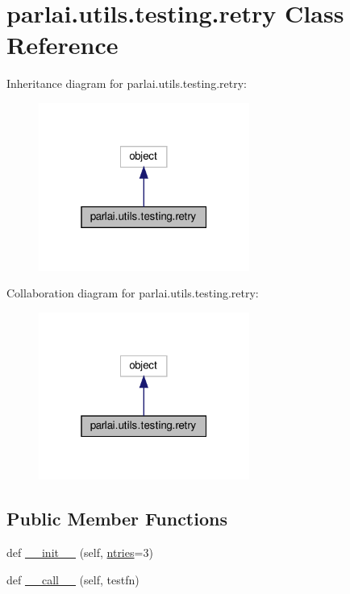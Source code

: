 \hypertarget{classparlai_1_1utils_1_1testing_1_1retry}{}\section{parlai.\+utils.\+testing.\+retry Class Reference}
\label{classparlai_1_1utils_1_1testing_1_1retry}


Inheritance diagram for parlai.\+utils.\+testing.\+retry\+:
\nopagebreak
\begin{figure}[H]
\begin{center}
\leavevmode
\includegraphics[width=196pt]{classparlai_1_1utils_1_1testing_1_1retry__inherit__graph}
\end{center}
\end{figure}


Collaboration diagram for parlai.\+utils.\+testing.\+retry\+:
\nopagebreak
\begin{figure}[H]
\begin{center}
\leavevmode
\includegraphics[width=196pt]{classparlai_1_1utils_1_1testing_1_1retry__coll__graph}
\end{center}
\end{figure}
\subsection*{Public Member Functions}
\begin{DoxyCompactItemize}
\item 
def \hyperlink{classparlai_1_1utils_1_1testing_1_1retry_a35e3eafac8f9ba72092a2a4d1b4c0545}{\+\_\+\+\_\+init\+\_\+\+\_\+} (self, \hyperlink{classparlai_1_1utils_1_1testing_1_1retry_abd5233dc28b07a53cd11347e5e44c44f}{ntries}=3)
\item 
def \hyperlink{classparlai_1_1utils_1_1testing_1_1retry_ac034808bb9ab13c8f8314d7069c6325e}{\+\_\+\+\_\+call\+\_\+\+\_\+} (self, testfn)
\end{DoxyCompactItemize}
